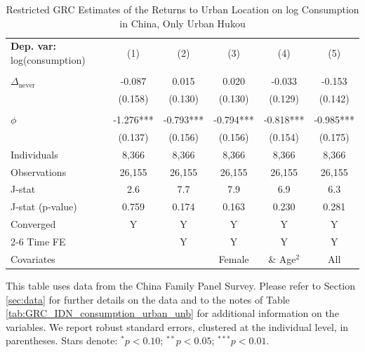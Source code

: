 \begin{table}[htbp] \centering \begin{threeparttable}
 \caption{Restricted GRC Estimates of the Returns to Urban Location on log Consumption in China, Only Urban Hukou} 
 \label{tab:GRC_CHN_only_urban_consumption_urban_unb} 
\begin{tabular}{l ccccc} \toprule  \textbf{Dep. var:}  log(consumption) 
                    &\multicolumn{1}{c}{(1)}   &\multicolumn{1}{c}{(2)}   &\multicolumn{1}{c}{(3)}   &\multicolumn{1}{c}{(4)}   &\multicolumn{1}{c}{(5)}   \\
                    &               &               &               &               &               \\
\addlinespace
$\Delta_{\text{never}}$&      -0.087   &       0.015   &       0.020   &      -0.033   &      -0.153   \\
                    &     (0.158)   &     (0.130)   &     (0.130)   &     (0.129)   &     (0.142)   \\
                    &               &               &               &               &               \\
\addlinespace
$\phi$              &      -1.276***&      -0.793***&      -0.794***&      -0.818***&      -0.985***\\
                    &     (0.137)   &     (0.156)   &     (0.156)   &     (0.154)   &     (0.175)   \\
\addlinespace
Individuals         &       8,366   &       8,366   &       8,366   &       8,366   &       8,366   \\
Observations        &      26,155   &      26,155   &      26,155   &      26,155   &      26,155   \\
J-stat              &         2.6   &         7.7   &         7.9   &         6.9   &         6.3   \\
J-stat (p-value)    &       0.759   &       0.174   &       0.163   &       0.230   &       0.281   \\
Converged           &           Y   &           Y   &           Y   &           Y   &           Y   \\
\cmidrule{2-6} Time FE & & Y & Y & Y & Y \\ Covariates & & & Female & \& Age$^2$ & All \\ \bottomrule \end{tabular} \begin{tablenotes}[flushleft] \footnotesize \item{This table uses data from the China Family Panel Survey. Please refer to Section \ref{sec:data} for further details on the data and to the notes of Table \ref{tab:GRC_IDN_consumption_urban_unb} for additional information on the variables. We report robust standard errors, clustered at the individual level, in parentheses. Stars denote: $^{*} p<0.10$; $^{**} p<0.05$; $^{***} p<0.01$.} \end{tablenotes} \end{threeparttable} \end{table}
